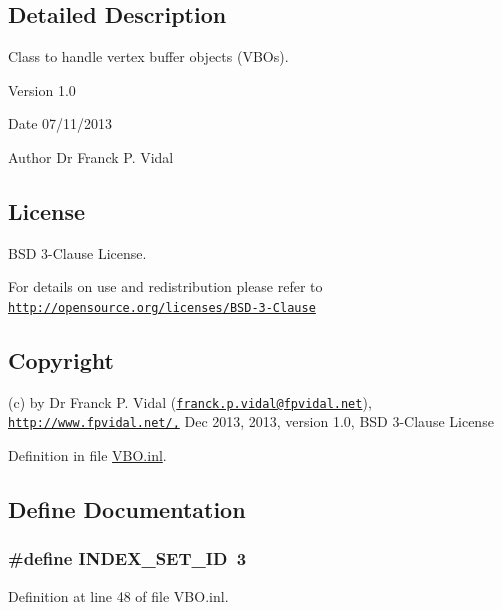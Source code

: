 \subsection{Detailed Description}
Class to handle vertex buffer objects (VBOs). \begin{DoxyVersion}{Version}
1.0
\end{DoxyVersion}
\begin{DoxyDate}{Date}
07/11/2013
\end{DoxyDate}
\begin{DoxyAuthor}{Author}
Dr Franck P. Vidal
\end{DoxyAuthor}
\hypertarget{_x_ray_renderer_8inl_License}{}\subsection{License}\label{_x_ray_renderer_8inl_License}
BSD 3-\/Clause License.

For details on use and redistribution please refer to \href{http://opensource.org/licenses/BSD-3-Clause}{\tt http://opensource.org/licenses/BSD-\/3-\/Clause}\hypertarget{_x_ray_renderer_8inl_Copyright}{}\subsection{Copyright}\label{_x_ray_renderer_8inl_Copyright}
(c) by Dr Franck P. Vidal (\href{mailto:franck.p.vidal@fpvidal.net}{\tt franck.p.vidal@fpvidal.net}), \href{http://www.fpvidal.net/,}{\tt http://www.fpvidal.net/,} Dec 2013, 2013, version 1.0, BSD 3-\/Clause License 

Definition in file \hyperlink{_v_b_o_8inl_source}{VBO.inl}.



\subsection{Define Documentation}
\hypertarget{_v_b_o_8inl_a3abfde2238b90851090b81855ff71070}{
\subsubsection[{INDEX\_\-SET\_\-ID}]{\setlength{\rightskip}{0pt plus 5cm}\#define INDEX\_\-SET\_\-ID~3}}
\label{_v_b_o_8inl_a3abfde2238b90851090b81855ff71070}


Definition at line 48 of file VBO.inl.

